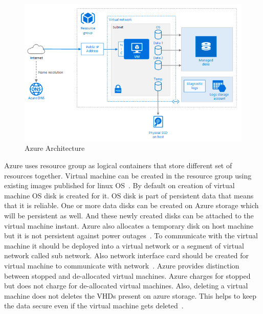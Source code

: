  \begin{figure}[!ht]
        \centering\includegraphics[width=\columnwidth]
        {image/azure-architecture.PNG}
        \caption{Azure Architecture~\cite{hid-sp18-502-azure-archi}}
        \label{fig:azure-architecture}
\end{figure}

Azure uses resource group as logical containers that store different set of
resources together. Virtual machine can be created in the resource group using
existing images published for linux OS~\cite{hid-sp18-502-azure-archi}. By
default on creation of virtual machine OS disk is created for it. OS disk is
part of persistent data that means that it is reliable. One or more data disks
can be created on Azure storage which will be persistent as well. And these
newly created disks can be attached to the virtual machine instant. Azure also
allocates a temporary disk on host machine but it is not persistent against
power outages~\cite{hid-sp18-502-azure-archi}. To communicate
with the virtual machine it should be deployed into a virtual network or a
segment of virtual network called sub network. Also network interface card
should be created for virtual machine to communicate with
network~\cite{hid-sp18-502-azure-archi}. Azure provides distinction between
stopped and de-allocated virtual machines. Azure charges for stopped but does
not charge for de-allocated virtual machines. Also, deleting a virtual machine
does not deletes the VHDs present on azure storage. This helps to keep the data
secure even if the virtual machine gets
deleted~\cite{hid-sp18-502-azure-archi}.


